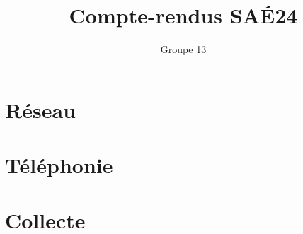 \documentclass{article}
\author{Groupe 13}
\title{Compte-rendus SAÉ24}
\begin{document}
\maketitle
\tableofcontents
\newpage
\listoffigures
\newpage
\listoflistings

\newpage
\section{Réseau}

\newpage
\section{Téléphonie}

\newpage
\section{Collecte}

\newpage
{}
\end{document}
